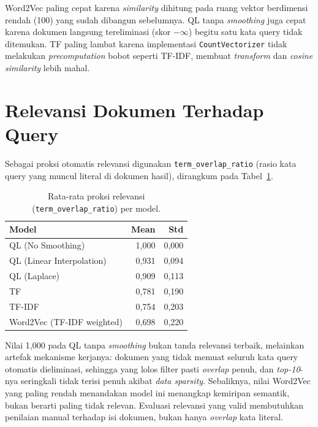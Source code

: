 \documentclass[10pt,a4paper]{article}
\begin{document}
Word2Vec paling cepat karena \emph{similarity} dihitung pada ruang vektor berdimensi rendah (100) yang sudah dibangun sebelumnya. QL tanpa \emph{smoothing} juga cepat karena dokumen langsung tereliminasi (skor $-\infty$) begitu satu kata query tidak ditemukan. TF paling lambat karena implementasi \texttt{CountVectorizer} tidak melakukan \emph{precomputation} bobot seperti TF-IDF, membuat \emph{transform} dan \emph{cosine similarity} lebih mahal.

\section{Relevansi Dokumen Terhadap Query}

Sebagai proksi otomatis relevansi digunakan \texttt{term\_overlap\_ratio} (rasio kata query yang muncul literal di dokumen hasil), dirangkum pada Tabel~\ref{tab:relevansi}.

\begin{table}[h]
    \centering
    \small
    \begin{tabular}{lrr}
        \toprule
        \textbf{Model} & \textbf{Mean} & \textbf{Std} \\
        \midrule
        QL (No Smoothing)          & 1,000 & 0,000 \\
        QL (Linear Interpolation)  & 0,931 & 0,094 \\
        QL (Laplace)               & 0,909 & 0,113 \\
        TF                         & 0,781 & 0,190 \\
        TF-IDF                     & 0,754 & 0,203 \\
        Word2Vec (TF-IDF weighted) & 0,698 & 0,220 \\
        \bottomrule
    \end{tabular}
    \caption{Rata-rata proksi relevansi (\texttt{term\_overlap\_ratio}) per model.}
    \label{tab:relevansi}
\end{table}

Nilai 1,000 pada QL tanpa \emph{smoothing} bukan tanda relevansi terbaik, melainkan artefak mekanisme kerjanya: dokumen yang tidak memuat seluruh kata query otomatis dieliminasi, sehingga yang lolos filter pasti \emph{overlap} penuh, dan \emph{top-10}-nya seringkali tidak terisi penuh akibat \emph{data sparsity}. Sebaliknya, nilai Word2Vec yang paling rendah menandakan model ini menangkap kemiripan semantik, bukan berarti paling tidak relevan. Evaluasi relevansi yang valid membutuhkan penilaian manual terhadap isi dokumen, bukan hanya \emph{overlap} kata literal.
\end{document}
